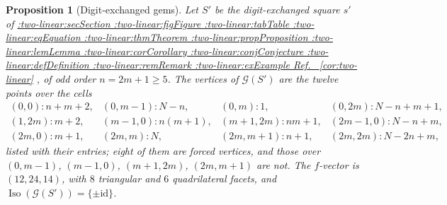 \documentclass[11pt,a4paper]{article}
\makeatletter
\def\Cref@getprefix#1:#2\relax{#1}
\def\Cref@prefix@sec{sec}
\def\Cref@prefix@fig{fig}
\def\Cref@prefix@tab{tab}
\def\Cref@prefix@eq{eq}
\def\Cref@prefix@thm{thm}
\def\Cref@prefix@prop{prop}
\def\Cref@prefix@lem{lem}
\def\Cref@prefix@cor{cor}
\def\Cref@prefix@conj{conj}
\def\Cref@prefix@def{def}
\def\Cref@prefix@rem{rem}
\def\Cref@prefix@ex{ex}
\def\Cref@type@cap#1{%
  \edef\Cref@tmp{#1}%
  \ifx\Cref@tmp\Cref@prefix@sec Section%
  \else\ifx\Cref@tmp\Cref@prefix@fig Figure%
  \else\ifx\Cref@tmp\Cref@prefix@tab Table%
  \else\ifx\Cref@tmp\Cref@prefix@eq Equation%
  \else\ifx\Cref@tmp\Cref@prefix@thm Theorem%
  \else\ifx\Cref@tmp\Cref@prefix@prop Proposition%
  \else\ifx\Cref@tmp\Cref@prefix@lem Lemma%
  \else\ifx\Cref@tmp\Cref@prefix@cor Corollary%
  \else\ifx\Cref@tmp\Cref@prefix@conj Conjecture%
  \else\ifx\Cref@tmp\Cref@prefix@def Definition%
  \else\ifx\Cref@tmp\Cref@prefix@rem Remark%
  \else\ifx\Cref@tmp\Cref@prefix@ex Example%
  \else Ref.%
  \fi\fi\fi\fi\fi\fi\fi\fi\fi\fi\fi\fi
}
\DeclareRobustCommand{\Cref}[1]{%
  \begingroup
  \edef\Cref@label{#1}%
  \edef\Cref@prefix{\expandafter\Cref@getprefix\Cref@label:\relax}%
  \hyperref[#1]{\Cref@type@cap{\Cref@prefix}~\ref*{#1}}%
  \endgroup
}
\theoremstyle{plain}
\newtheorem{proposition}[theorem]{Proposition}
\theoremstyle{definition}
\theoremstyle{remark}
\makeatother
\begin{document}
\begin{proposition}[Digit-exchanged gems]
\label{prop:exchanged}
Let $S'$ be the digit-exchanged square $s'$ of \Cref{cor:two-linear}, of odd order $n=2m+1\ge5$.
The vertices of $\mathcal G(S')$ are the twelve points over the cells
\[
\begin{array}{llll}
(0,0)\colon n+m+2, & (0,m-1)\colon N-n, & (0,m)\colon 1, & (0,2m)\colon N-n+m+1,\\
(1,2m)\colon m+2, & (m-1,0)\colon n(m+1), & (m+1,2m)\colon nm+1, & (2m-1,0)\colon N-n+m,\\
(2m,0)\colon m+1, & (2m,m)\colon N, & (2m,m+1)\colon n+1, & (2m,2m)\colon N-2n+m,
\end{array}
\]
listed with their entries; eight of them are forced vertices, and those over $(0,m-1)$, $(m-1,0)$, $(m+1,2m)$, $(2m,m+1)$ are not.
The $f$-vector is $(12,24,14)$, with $8$ triangular and $6$ quadrilateral facets, and $\operatorname{Iso}(\mathcal G(S'))=\{\pm\mathrm{id}\}$.
\end{proposition}
\end{document}
